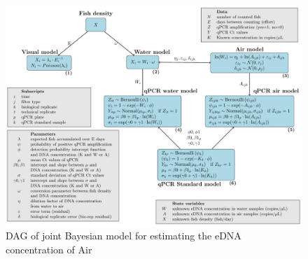 \documentclass{article}
\begin{document}
\begin{figure}[tbhp] 
\centering
\includegraphics[width=16.5cm]{Plots/DAG.pdf}  
\caption{DAG of joint Bayesian model for estimating the eDNA concentration of Air}
\label{fig:DAG}
\end{figure}
\end{document}
